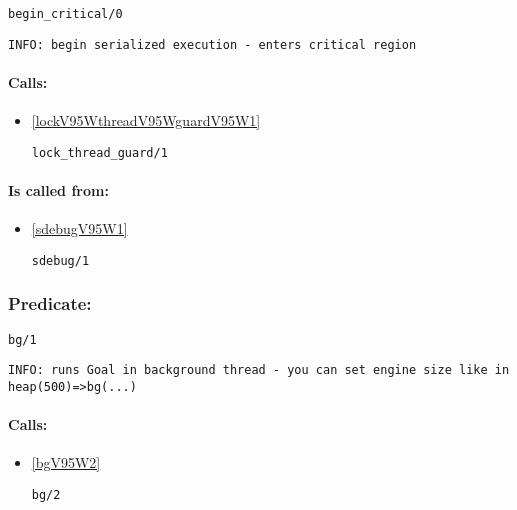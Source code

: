 \begin{verbatim}
begin_critical/0
\end{verbatim}

{\small \begin{verbatim}
INFO: begin serialized execution - enters critical region

\end{verbatim}}
\paragraph{Calls:} 
\begin{itemize}
\item \ref{lockV95WthreadV95WguardV95W1} 
\begin{verbatim}
lock_thread_guard/1
\end{verbatim}

\end{itemize}
\paragraph{Is called from:} 
\begin{itemize}
\item \ref{sdebugV95W1} 
\begin{verbatim}
sdebug/1
\end{verbatim}

\end{itemize}

\subsubsection{Predicate:} \label{bgV95W1}

\begin{verbatim}
bg/1
\end{verbatim}

{\small \begin{verbatim}
INFO: runs Goal in background thread - you can set engine size like in heap(500)=>bg(...)

\end{verbatim}}
\paragraph{Calls:} 
\begin{itemize}
\item \ref{bgV95W2} 
\begin{verbatim}
bg/2
\end{verbatim}

\end{itemize}
